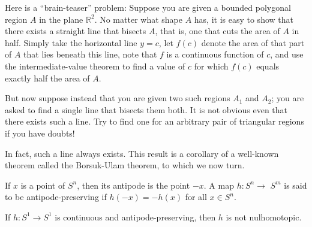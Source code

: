  Here is a ``brain-teaser'' problem: Suppose you are given a bounded polygonal region \(A\) in the plane \(\mathbb{R}^{2}\). No matter what shape \(A\) has, it is easy to show that there exists a straight line that bisects \(A\), that is, one that cuts the area of \(A\) in half. Simply take the horizontal line \(y = c\), let \(f( c)\) denote the area of that part of \(A\) that lies beneath this line, note that \(f\) is a continuous function of \(c\), and use the intermediate-value theorem to find a value of \(c\) for which \(f( c)\) equals exactly half the area of \(A\).

But now suppose instead that you are given two such regions \(A_{1}\) and \(A_{2}\); you are asked to find a single line that bisects them both. It is not obvious even that there exists such a line. Try to find one for an arbitrary pair of triangular regions if you have doubts!

In fact, such a line always exists. This result is a corollary of a well-known theorem called the Borsuk-Ulam theorem, to which we now turn.

\begin{definition}
If \(x\) is a point of \(S^{n}\), then its antipode is the point \(- x\). A map \(h : S^{n} \rightarrow\) \(S^{m}\) is said to be antipode-preserving if \(h( {-x}) = - h(x)\) for all \(x \in {S}^{n}\).
\end{definition}

\begin{theorem}
\label{thm:\thetheorem}
If \(h : S^{1} \rightarrow {S}^{1}\) is continuous and antipode-preserving, then \(h\) is not nulhomotopic.
\end{theorem}

